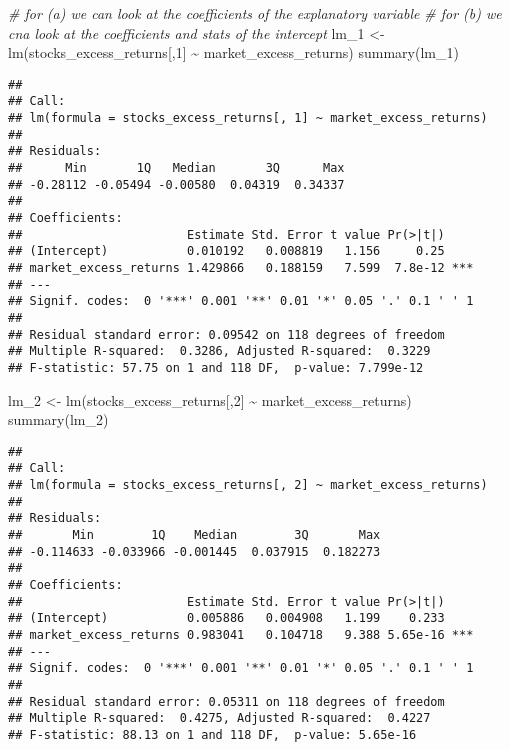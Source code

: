 \documentclass[
]{article}
\newenvironment{Shaded}{\begin{snugshade}}{\end{snugshade}}
\newcommand{\CommentTok}[1]{\textcolor[rgb]{0.56,0.35,0.01}{\textit{#1}}}
\newcommand{\DecValTok}[1]{\textcolor[rgb]{0.00,0.00,0.81}{#1}}
\newcommand{\FunctionTok}[1]{\textcolor[rgb]{0.00,0.00,0.00}{#1}}
\newcommand{\NormalTok}[1]{#1}
\newcommand{\OtherTok}[1]{\textcolor[rgb]{0.56,0.35,0.01}{#1}}
\newcommand{\SpecialCharTok}[1]{\textcolor[rgb]{0.00,0.00,0.00}{#1}}
\begin{document}
\begin{Shaded}
\begin{Highlighting}[]
\CommentTok{\# for (a) we can look at the coefficients of the explanatory variable}
\CommentTok{\# for (b) we cna look at the coefficients and stats of the intercept}
\NormalTok{lm\_1 }\OtherTok{\textless{}{-}} \FunctionTok{lm}\NormalTok{(stocks\_excess\_returns[,}\DecValTok{1}\NormalTok{] }\SpecialCharTok{\textasciitilde{}}\NormalTok{ market\_excess\_returns)}
\FunctionTok{summary}\NormalTok{(lm\_1)}
\end{Highlighting}
\end{Shaded}

\begin{verbatim}
## 
## Call:
## lm(formula = stocks_excess_returns[, 1] ~ market_excess_returns)
## 
## Residuals:
##      Min       1Q   Median       3Q      Max 
## -0.28112 -0.05494 -0.00580  0.04319  0.34337 
## 
## Coefficients:
##                       Estimate Std. Error t value Pr(>|t|)    
## (Intercept)           0.010192   0.008819   1.156     0.25    
## market_excess_returns 1.429866   0.188159   7.599  7.8e-12 ***
## ---
## Signif. codes:  0 '***' 0.001 '**' 0.01 '*' 0.05 '.' 0.1 ' ' 1
## 
## Residual standard error: 0.09542 on 118 degrees of freedom
## Multiple R-squared:  0.3286, Adjusted R-squared:  0.3229 
## F-statistic: 57.75 on 1 and 118 DF,  p-value: 7.799e-12
\end{verbatim}

\begin{Shaded}
\begin{Highlighting}[]
\NormalTok{lm\_2 }\OtherTok{\textless{}{-}} \FunctionTok{lm}\NormalTok{(stocks\_excess\_returns[,}\DecValTok{2}\NormalTok{] }\SpecialCharTok{\textasciitilde{}}\NormalTok{ market\_excess\_returns)}
\FunctionTok{summary}\NormalTok{(lm\_2)}
\end{Highlighting}
\end{Shaded}

\begin{verbatim}
## 
## Call:
## lm(formula = stocks_excess_returns[, 2] ~ market_excess_returns)
## 
## Residuals:
##       Min        1Q    Median        3Q       Max 
## -0.114633 -0.033966 -0.001445  0.037915  0.182273 
## 
## Coefficients:
##                       Estimate Std. Error t value Pr(>|t|)    
## (Intercept)           0.005886   0.004908   1.199    0.233    
## market_excess_returns 0.983041   0.104718   9.388 5.65e-16 ***
## ---
## Signif. codes:  0 '***' 0.001 '**' 0.01 '*' 0.05 '.' 0.1 ' ' 1
## 
## Residual standard error: 0.05311 on 118 degrees of freedom
## Multiple R-squared:  0.4275, Adjusted R-squared:  0.4227 
## F-statistic: 88.13 on 1 and 118 DF,  p-value: 5.65e-16
\end{verbatim}
\end{document}
